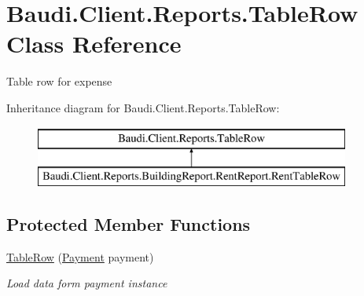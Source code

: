 \hypertarget{class_baudi_1_1_client_1_1_reports_1_1_table_row}{}\section{Baudi.\+Client.\+Reports.\+Table\+Row Class Reference}
\label{class_baudi_1_1_client_1_1_reports_1_1_table_row}


Table row for expense  


Inheritance diagram for Baudi.\+Client.\+Reports.\+Table\+Row\+:\begin{figure}[H]
\begin{center}
\leavevmode
\includegraphics[height=2.000000cm]{class_baudi_1_1_client_1_1_reports_1_1_table_row}
\end{center}
\end{figure}
\subsection*{Protected Member Functions}
\begin{DoxyCompactItemize}
\item 
\hyperlink{class_baudi_1_1_client_1_1_reports_1_1_table_row_a6b5674450c457039ab504a4ca01d1bf0}{Table\+Row} (\hyperlink{class_baudi_1_1_d_a_l_1_1_models_1_1_payment}{Payment} payment)
\begin{DoxyCompactList}\small\item\em Load data form payment instance \end{DoxyCompactList}\end{DoxyCompactItemize}
